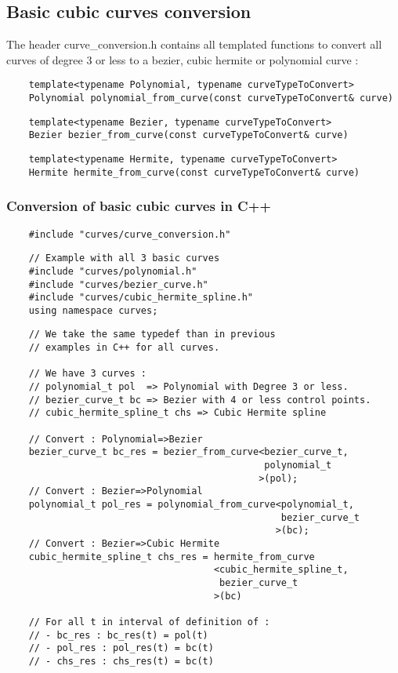 \documentclass{article}
\begin{document}
\subsection{Basic cubic curves conversion}
    The header curve\_conversion.h contains all templated functions to convert all curves of degree 3 or less to a bezier, cubic hermite or polynomial curve :
    \begin{lstlisting}
    template<typename Polynomial, typename curveTypeToConvert>
    Polynomial polynomial_from_curve(const curveTypeToConvert& curve)
    \end{lstlisting}
    \begin{lstlisting}
    template<typename Bezier, typename curveTypeToConvert>
    Bezier bezier_from_curve(const curveTypeToConvert& curve)
    \end{lstlisting}
    \begin{lstlisting}
    template<typename Hermite, typename curveTypeToConvert>
    Hermite hermite_from_curve(const curveTypeToConvert& curve)
    \end{lstlisting}

    \subsubsection{Conversion of basic cubic curves in C++}
    \begin{lstlisting}
    #include "curves/curve_conversion.h"
    \end{lstlisting}
    \begin{lstlisting}
    // Example with all 3 basic curves
    #include "curves/polynomial.h"
    #include "curves/bezier_curve.h"
    #include "curves/cubic_hermite_spline.h"
    using namespace curves;
    \end{lstlisting}
    \begin{lstlisting}
    // We take the same typedef than in previous
    // examples in C++ for all curves.

    // We have 3 curves :
    // polynomial_t pol  => Polynomial with Degree 3 or less.
    // bezier_curve_t bc => Bezier with 4 or less control points.
    // cubic_hermite_spline_t chs => Cubic Hermite spline

    // Convert : Polynomial=>Bezier
    bezier_curve_t bc_res = bezier_from_curve<bezier_curve_t,
                                              polynomial_t
                                             >(pol);
    // Convert : Bezier=>Polynomial
    polynomial_t pol_res = polynomial_from_curve<polynomial_t,
                                                 bezier_curve_t
                                                >(bc);
    // Convert : Bezier=>Cubic Hermite
    cubic_hermite_spline_t chs_res = hermite_from_curve
                                     <cubic_hermite_spline_t,
                                      bezier_curve_t
                                     >(bc)

    // For all t in interval of definition of :
    // - bc_res : bc_res(t) = pol(t)
    // - pol_res : pol_res(t) = bc(t)
    // - chs_res : chs_res(t) = bc(t)
    \end{lstlisting}
\end{document}

